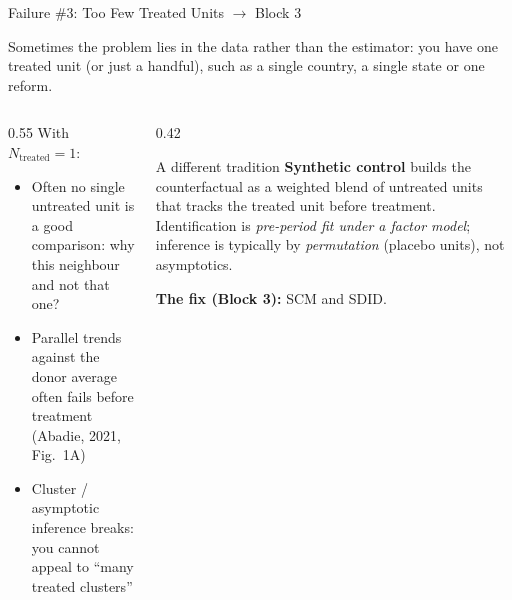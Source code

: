 \documentclass[main.tex]{subfiles}
\begin{document}
\begin{frame}{Failure \#3: Too Few Treated Units \hfill {\small$\rightarrow$ Block 3}}

  Sometimes the problem lies in the data rather than the estimator: you have
  \alert{one treated unit} (or just a handful), such as a single country, a
  single state or one reform.

  \medskip
  \begin{columns}[T]
    \begin{column}{0.55\textwidth}
      With $N_{\text{treated}}=1$:
      \begin{itemize}
        \item Often no single untreated unit is a \alert{good comparison}:
          why this neighbour and not that one?
        \item Parallel trends against the donor average often \alert{fails
          before treatment} (Abadie, 2021, Fig.~1A)
        \item Cluster / asymptotic inference \alert{breaks}: you cannot
          appeal to ``many treated clusters''
      \end{itemize}
    \end{column}
    \begin{column}{0.42\textwidth}
      \begin{block}{A different tradition}
        \textbf{Synthetic control} builds the counterfactual as a
        \alert{weighted blend} of untreated units that tracks the treated unit
        before treatment. Identification is \emph{pre-period fit under a factor
        model}; inference is typically by \emph{permutation} (placebo units), not
        asymptotics.
      \end{block}
      \textbf{The fix (Block 3):} SCM and SDID.
    \end{column}
  \end{columns}

\end{frame}
\end{document}
